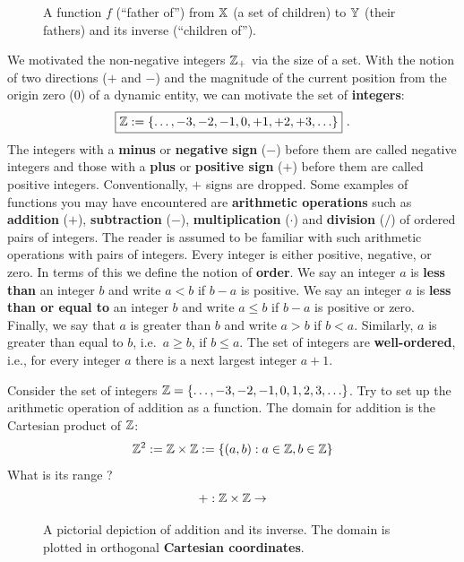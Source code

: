 \begin{figure}[htpb]
\caption{A function $f$ (``father of'') from $\mathbb{X}$ (a set of children) to $\mathbb{Y}$ (their fathers) and its inverse (``children of'').\label{F:function}}
\vspace{4cm}
\end{figure}

We motivated the non-negative integers $\mathbb{Z}_+$ via the size of a set.  With the notion of two directions ($+$ and $-$) and the magnitude of the current position from the origin zero ($0$) of a dynamic entity, we can motivate the set of {\bf integers}:
$$\boxed{\mathbb{Z} := \{\ldots,-3,-2,-1,0,+1,+2,+3,\ldots\}} \ .$$
The integers with a {\bf minus} or {\bf negative sign} ($-$) before them are called negative integers and those with a {\bf plus} or {\bf positive sign} ($+$) before them are called positive integers.  Conventionally, $+$ signs are dropped.  Some examples of functions you may have encountered are {\bf arithmetic operations} such as {\bf addition} ($+$), {\bf subtraction} ($-$), {\bf multiplication} ($\cdot$) and {\bf division} ($/$) of ordered pairs of integers.  The reader is assumed to be familiar with such arithmetic operations with pairs of integers.  Every integer is either positive, negative, or zero.  In terms of this we define the notion of {\bf order}.  We say an integer $a$ is {\bf less than} an integer $b$ and write $a < b$ if $b-a$ is positive.  We say an integer $a$ is {\bf less than or equal to} an integer $b$ and write $a \leq b$ if $b-a$ is positive or zero.  Finally, we say that $a$ is greater than $b$ and write $a > b$ if $b<a$.  Similarly, $a$ is greater than equal to $b$, i.e.~$a \geq b$, if $b \leq a$.  The set of integers are {\bf well-ordered}, i.e., for every integer $a$ there is a next largest integer $a+1$.

\begin{classwork}\label{CW:AdditionMapAndItsInverseMap}
Consider the set of integers $\mathbb{Z} = \{\ldots,-3,-2,-1,0,1,2,3,\ldots\}$.  Try to set up the arithmetic operation of addition as a function.  The domain for addition is the Cartesian product of $\mathbb{Z}$:
\[
 \mathbb{Z}^2 := \mathbb{Z} \times \mathbb{Z} := \{(a,b) : a \in \mathbb{Z}, b \in \mathbb{Z} \}
\]  
What is its range ?  
\[
+ : \mathbb{Z} \times \mathbb{Z} \to
\]
\begin{figure}[htpb]
\caption{A pictorial depiction of addition and its inverse.  The domain is plotted in orthogonal  {\bf Cartesian coordinates}.\label{F:Addfunction}}
\vspace{5cm}
\end{figure}
\end{classwork}

